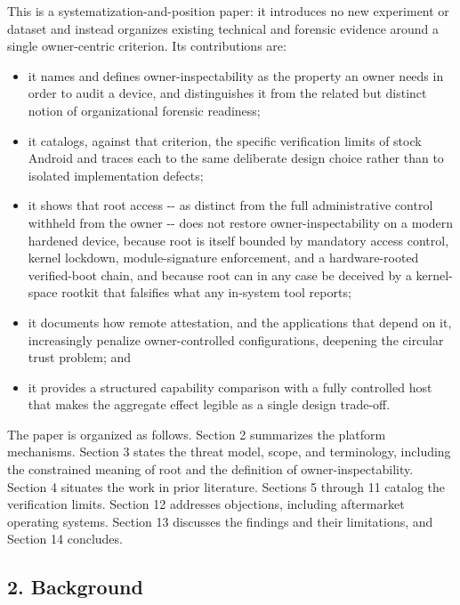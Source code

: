 \documentclass[
]{article}
\providecommand{\tightlist}{%
  \setlength{\itemsep}{0pt}\setlength{\parskip}{0pt}}
\begin{document}
This is a systematization-and-position paper: it introduces no new
experiment or dataset and instead organizes existing technical and
forensic evidence around a single owner-centric criterion. Its
contributions are:

\begin{itemize}
\tightlist
\item
  it names and defines owner-inspectability as the property an owner
  needs in order to audit a device, and distinguishes it from the
  related but distinct notion of organizational forensic readiness;
\item
  it catalogs, against that criterion, the specific verification limits
  of stock Android and traces each to the same deliberate design choice
  rather than to isolated implementation defects;
\item
  it shows that root access -\/- as distinct from the full
  administrative control withheld from the owner -\/- does not restore
  owner-inspectability on a modern hardened device, because root is
  itself bounded by mandatory access control, kernel lockdown,
  module-signature enforcement, and a hardware-rooted verified-boot
  chain, and because root can in any case be deceived by a kernel-space
  rootkit that falsifies what any in-system tool reports;
\item
  it documents how remote attestation, and the applications that depend
  on it, increasingly penalize owner-controlled configurations,
  deepening the circular trust problem; and
\item
  it provides a structured capability comparison with a fully controlled
  host that makes the aggregate effect legible as a single design
  trade-off.
\end{itemize}

The paper is organized as follows. Section 2 summarizes the platform
mechanisms. Section 3 states the threat model, scope, and terminology,
including the constrained meaning of root and the definition of
owner-inspectability. Section 4 situates the work in prior literature.
Sections 5 through 11 catalog the verification limits. Section 12
addresses objections, including aftermarket operating systems. Section
13 discusses the findings and their limitations, and Section 14
concludes.

\subsection{2. Background}\label{background}
\end{document}
